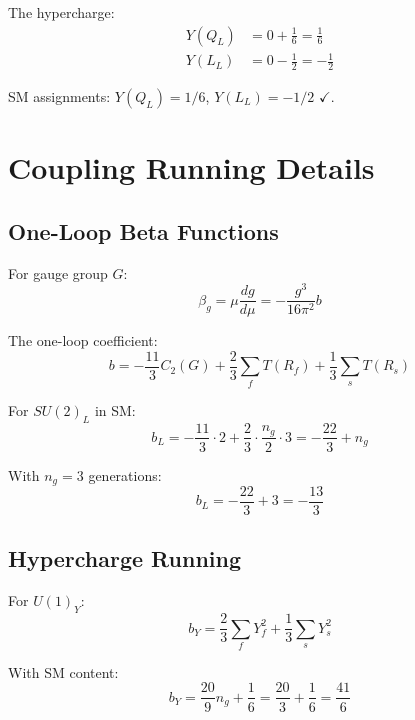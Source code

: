 \documentclass[11pt,a4paper]{article}
\begin{document}
The hypercharge:
\begin{align}
\label{eq:y-ql}
Y(Q_L) &= 0 + \frac{1}{6} = \frac{1}{6} \\
\label{eq:y-ll}
Y(L_L) &= 0 - \frac{1}{2} = -\frac{1}{2}
\end{align}

SM assignments: $Y(Q_L) = 1/6$, $Y(L_L) = -1/2$ $\checkmark$.

\section{Coupling Running Details}
\label{app:running-details}

\subsection{One-Loop Beta Functions}
\label{app:beta-functions}

For gauge group $G$:
\begin{equation}
\label{eq:beta-general}
\beta_g = \mu \frac{dg}{d\mu} = -\frac{g^3}{16\pi^2} b
\end{equation}

The one-loop coefficient:
\begin{equation}
\label{eq:b-coefficient}
b = -\frac{11}{3} C_2(G) + \frac{2}{3} \sum_f T(R_f) + \frac{1}{3} \sum_s T(R_s)
\end{equation}

For $SU(2)_L$ in SM:
\begin{equation}
\label{eq:b-su2l}
b_L = -\frac{11}{3} \cdot 2 + \frac{2}{3} \cdot \frac{n_g}{2} \cdot 3 = -\frac{22}{3} + n_g
\end{equation}

With $n_g = 3$ generations:
\begin{equation}
\label{eq:bl-value}
b_L = -\frac{22}{3} + 3 = -\frac{13}{3}
\end{equation}

\subsection{Hypercharge Running}
\label{app:y-running}

For $U(1)_Y$:
\begin{equation}
\label{eq:b-u1y}
b_Y = \frac{2}{3} \sum_f Y_f^2 + \frac{1}{3} \sum_s Y_s^2
\end{equation}

With SM content:
\begin{equation}
\label{eq:by-value}
b_Y = \frac{20}{9} n_g + \frac{1}{6} = \frac{20}{3} + \frac{1}{6} = \frac{41}{6}
\end{equation}
\end{document}
